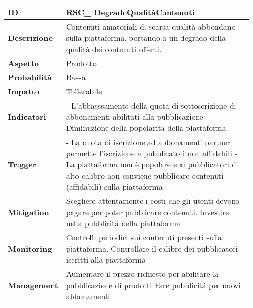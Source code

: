 \begin{tabular}{|p{2.2cm}|p{9.6cm}| } 
 	\hline
	 \textbf{ID} & RSC\_ DegradoQualitàContenuti\\ [0.5ex] 
	\hline
	\textbf{Descrizione} & Contenuti amatoriali di scarsa qualità abbondano sulla piattaforma, portando a un degrado della qualità dei contenuti offerti. \\ 
	\hline
   	\textbf{Aspetto} &  Prodotto \\
	\hline
	\textbf{Probabilità} &  Bassa \\ 
	\hline
	\textbf{Impatto} &  Tollerabile \\ 
	\hline
	\textbf{Indicatori} & - L'abbasssamento della quota di sottoscrizione di abbonamenti abilitati alla pubblicazione \newline
						  - Diminuzione della popolarit\'a della piattaforma\\
	\hline
	\textbf{Trigger} & - La quota di iscrizione ad abbonamenti partner permette l'iscrizione a pubblicatori non affidabili\newline
					   - La piattaforma non è popolare e ai pubblicatori di alto calibro non conviene pubblicare contenuti (affidabili) sulla piattaforma\\
	\hline
	\textbf{Mitigation} & Scegliere attentamente i costi che gli utenti devono pagare per poter pubblicare contenuti. \newline
						  Investire nella pubblicit\'a della piattaforma \\ 
	\hline
	\textbf{Monitoring} & Controlli periodici sui contenuti presenti sulla piattaforma. \newline
						  Controllare il calibro dei pubblicatori iscritti alla piattaforma \\ 
	\hline
	\textbf{Management} & Aumentare il prezzo richiesto per abilitare la pubblicazione di prodotti \newline
						  Fare pubblicit\'a per nuovi abbonamenti\\ 
	\hline
\end{tabular}


